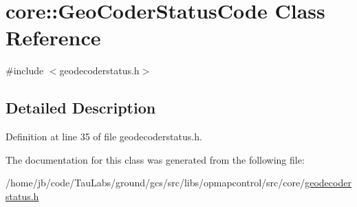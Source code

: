 \hypertarget{classcore_1_1_geo_coder_status_code}{\section{core\-:\-:\-Geo\-Coder\-Status\-Code \-Class \-Reference}
\label{classcore_1_1_geo_coder_status_code}
}


{\ttfamily \#include $<$geodecoderstatus.\-h$>$}



\subsection{\-Detailed \-Description}


\-Definition at line 35 of file geodecoderstatus.\-h.



\-The documentation for this class was generated from the following file\-:\begin{DoxyCompactItemize}
\item 
/home/jb/code/\-Tau\-Labs/ground/gcs/src/libs/opmapcontrol/src/core/\hyperlink{geodecoderstatus_8h}{geodecoderstatus.\-h}\end{DoxyCompactItemize}
